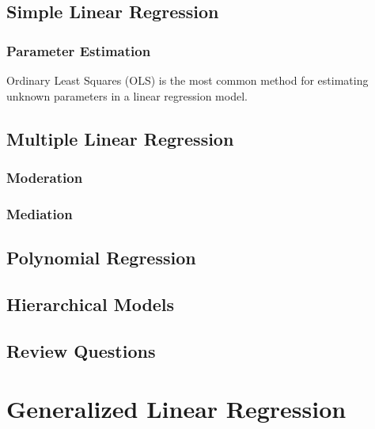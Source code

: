 \documentclass[]{book}
\begin{document}
\hypertarget{simple-linear-regression}{%
\section{Simple Linear Regression}\label{simple-linear-regression}}

\hypertarget{parameter-estimation}{%
\subsection{Parameter Estimation}\label{parameter-estimation}}

Ordinary Least Squares (OLS) is the most common method for estimating unknown parameters in a linear regression model.

\hypertarget{multiple-linear-regression}{%
\section{Multiple Linear Regression}\label{multiple-linear-regression}}

\hypertarget{moderation}{%
\subsection{Moderation}\label{moderation}}

\hypertarget{mediation}{%
\subsection{Mediation}\label{mediation}}

\hypertarget{polynomial-regression}{%
\section{Polynomial Regression}\label{polynomial-regression}}

\hypertarget{hierarchical-models}{%
\section{Hierarchical Models}\label{hierarchical-models}}

\hypertarget{review-questions-7}{%
\section{Review Questions}\label{review-questions-7}}

\hypertarget{glm}{%
\chapter{Generalized Linear Regression}\label{glm}}
\end{document}
